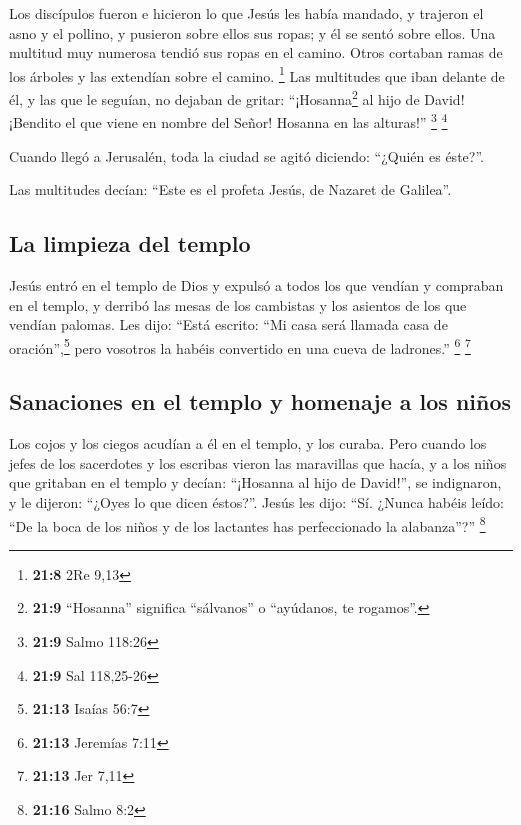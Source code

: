 \begin{paracol}{2}
 Los discípulos fueron e hicieron lo que Jesús les había
mandado,  y trajeron el asno y el pollino, y pusieron
sobre ellos sus ropas; y él se sentó sobre ellos.  Una
multitud muy numerosa tendió sus ropas en el camino. Otros cortaban
ramas de los árboles y las extendían sobre el camino. \footnote{\textbf{21:8}
  2Re 9,13}  Las multitudes que iban delante de él, y las
que le seguían, no dejaban de gritar: ``¡Hosanna\footnote{\textbf{21:9}
  ``Hosanna'' significa ``sálvanos'' o ``ayúdanos, te rogamos''.} al
hijo de David! ¡Bendito el que viene en nombre del Señor! Hosanna en las
alturas!'' \footnote{\textbf{21:9} Salmo 118:26} \footnote{\textbf{21:9}
  Sal 118,25-26}

 Cuando llegó a Jerusalén, toda la ciudad se agitó
diciendo: ``¿Quién es éste?''.

 Las multitudes decían: ``Este es el profeta Jesús, de
Nazaret de Galilea''.

\hypertarget{la-limpieza-del-templo}{%
\subsection{La limpieza del templo}\label{la-limpieza-del-templo}}

 Jesús entró en el templo de Dios y expulsó a todos los
que vendían y compraban en el templo, y derribó las mesas de los
cambistas y los asientos de los que vendían palomas.  Les
dijo: ``Está escrito: ``Mi casa será llamada casa de
oración'',\footnote{\textbf{21:13} Isaías 56:7} pero vosotros la habéis
convertido en una cueva de ladrones.'' \footnote{\textbf{21:13} Jeremías
  7:11} \footnote{\textbf{21:13} Jer 7,11}

\hypertarget{sanaciones-en-el-templo-y-homenaje-a-los-niuxf1os}{%
\subsection{Sanaciones en el templo y homenaje a los
niños}\label{sanaciones-en-el-templo-y-homenaje-a-los-niuxf1os}}

 Los cojos y los ciegos acudían a él en el templo, y los
curaba.  Pero cuando los jefes de los sacerdotes y los
escribas vieron las maravillas que hacía, y a los niños que gritaban en
el templo y decían: ``¡Hosanna al hijo de David!'', se indignaron,
 y le dijeron: ``¿Oyes lo que dicen éstos?''. Jesús les
dijo: ``Sí. ¿Nunca habéis leído: ``De la boca de los niños y de los
lactantes has perfeccionado la alabanza''?'' \footnote{\textbf{21:16}
  Salmo 8:2}


\end{paracol}
